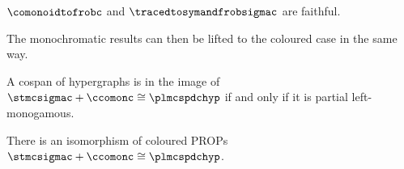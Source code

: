 \begin{corollary}
    \(\comonoidtofrobc\) and \(\tracedtosymandfrobsigmac\) are faithful.
\end{corollary}

The monochromatic results can then be lifted to the coloured case in the same
way.

\begin{theorem}\label{thm:comonoidc-fully-complete}
    A cospan of hypergraphs is in the image of
    \(\stmcsigmac + \ccomonc \cong \plmcspdchyp\) if and only if it is partial
    left-monogamous.
\end{theorem}

\begin{corollary}
    There is an isomorphism of coloured PROPs
    \(\stmcsigmac + \ccomonc \cong \plmcspdchyp\).
\end{corollary}